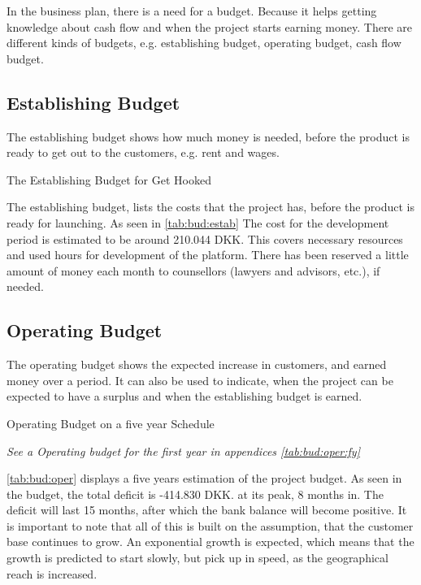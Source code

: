 In the business plan, there is a need for a budget. Because it helps getting knowledge about cash flow and when the project starts earning money. There are different kinds of budgets, e.g. establishing budget, operating budget, cash flow budget.


\subsection{Establishing Budget}
The establishing budget shows how much money is needed, before the product is ready to get out to the customers, e.g. rent and wages.


\begin{table}[H]
\centering
\caption{The Establishing Budget for Get Hooked}
\label{tab:bud:estab}

\end{table}

The establishing budget, lists the costs that the project has, before the product is ready for launching. As seen in \autoref{tab:bud:estab} The cost for the development period is estimated to be around 210.044 DKK. This covers necessary resources and used hours for development of the platform. There has been reserved a little amount of money each month to counsellors (lawyers and advisors, etc.), if needed.

\subsection{Operating Budget}

The operating budget shows the expected increase in customers, and earned money over a period. It can also be used to indicate, when the project can be expected to have a surplus and when the establishing budget is earned.

\begin{table*}[t!]
\centering
\caption{Operating Budget on a five year Schedule}
\label{tab:bud:oper}

\textit{See a Operating budget for the first year in appendices \ref{tab:bud:oper:fy}}
\end{table*}


\autoref{tab:bud:oper} displays a five years estimation of the project budget. As seen in the budget, the total deficit is -414.830 DKK. at its peak, 8 months in. The deficit will last 15 months, after which the bank balance will become positive. It is important to note that all of this is built on the assumption, that the customer base continues to grow. An exponential  growth is expected, which means that the growth is predicted to start slowly, but pick up in speed, as the geographical reach is increased.


